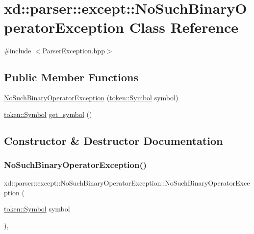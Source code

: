 \hypertarget{classxd_1_1parser_1_1except_1_1_no_such_binary_operator_exception}{}\section{xd\+:\+:parser\+:\+:except\+:\+:No\+Such\+Binary\+Operator\+Exception Class Reference}
\label{classxd_1_1parser_1_1except_1_1_no_such_binary_operator_exception}


{\ttfamily \#include $<$Parser\+Exception.\+hpp$>$}

\subsection*{Public Member Functions}
\begin{DoxyCompactItemize}
\item 
\mbox{\hyperlink{classxd_1_1parser_1_1except_1_1_no_such_binary_operator_exception_ace71c8d272fb1f6f6a4d147150a3e99a}{No\+Such\+Binary\+Operator\+Exception}} (\mbox{\hyperlink{classxd_1_1parser_1_1token_1_1_symbol}{token\+::\+Symbol}} symbol)
\item 
\mbox{\hyperlink{classxd_1_1parser_1_1token_1_1_symbol}{token\+::\+Symbol}} \mbox{\hyperlink{classxd_1_1parser_1_1except_1_1_no_such_binary_operator_exception_ae0bf0d0d4cdddfe45d72b1ef64b1117f}{get\+\_\+symbol}} ()
\end{DoxyCompactItemize}


\subsection{Constructor \& Destructor Documentation}
\mbox{\label{classxd_1_1parser_1_1except_1_1_no_such_binary_operator_exception_ace71c8d272fb1f6f6a4d147150a3e99a}} 
\subsubsection{\texorpdfstring{No\+Such\+Binary\+Operator\+Exception()}{NoSuchBinaryOperatorException()}}
{\footnotesize\ttfamily xd\+::parser\+::except\+::\+No\+Such\+Binary\+Operator\+Exception\+::\+No\+Such\+Binary\+Operator\+Exception (\begin{DoxyParamCaption}\item[{\mbox{\hyperlink{classxd_1_1parser_1_1token_1_1_symbol}{token\+::\+Symbol}}}]{symbol }\end{DoxyParamCaption})\hspace{0.3cm}{\ttfamily [inline]}, {\ttfamily [explicit]}}



